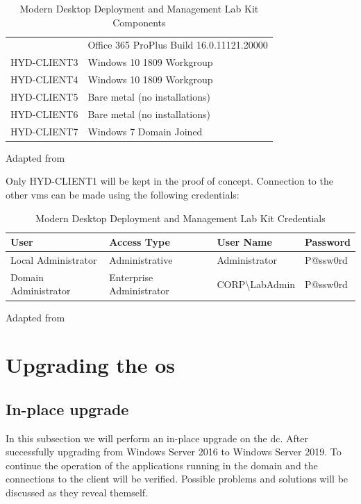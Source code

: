 \begin{table}[ht]
\begin{adjustbox}{width=1\textwidth}
\begin{tabular}{l|l}
		& Office 365 ProPlus Build 16.0.11121.20000                           									 \\
		HYD-CLIENT3  & Windows 10 1809 Workgroup                                         						  \\
		HYD-CLIENT4  & Windows 10 1809 Workgroup                                          						   \\
		HYD-CLIENT5 & Bare metal (no installations)                                      						    \\
		HYD-CLIENT6 & Bare metal (no installations)                                       							 \\
		HYD-CLIENT7  & Windows 7 Domain Joined                                            
	\end{tabular}
	\end{adjustbox}
	\caption[Lab Kit Components]{Modern Desktop Deployment and Management Lab Kit Components}
	\scriptsize	
	Adapted from \cite{MicrosoftCorporation2019}
	\label{tab:MDDMLK2016}
\end{table}

	
Only HYD-CLIENT1 will be kept in the proof of concept. Connection to the other \acrshort{vm}s can be made using the following credentials:
\begin{table}[ht]
	\centering
	\begin{adjustbox}{width=1\textwidth}
	\begin{tabular}{l|lll}
		User                 & Access Type              & User Name                    & Password \\
		\hline
		Local Administrator  & Administrative           & Administrator                & P@ssw0rd \\
		Domain Administrator & Enterprise Administrator & CORP\textbackslash{}LabAdmin & P@ssw0rd
	\end{tabular}
	\end{adjustbox}
	\caption[Lab Kit Credentials]{Modern Desktop Deployment and Management Lab Kit Credentials}
	\scriptsize	
	Adapted from \cite{MicrosoftCorporation2019}
	\label{tab:MDDMLK2016}
\end{table}

\section{Upgrading the \acrshort{os}}
\subsection{In-place upgrade}
In this subsection we will perform an in-place upgrade on the \acrfull{dc}. After successfully upgrading from Windows Server 2016 to Windows Server 2019. To continue the operation of the applications running in the domain and the connections to the client will be verified. Possible problems and solutions will be discussed as they reveal themself.
